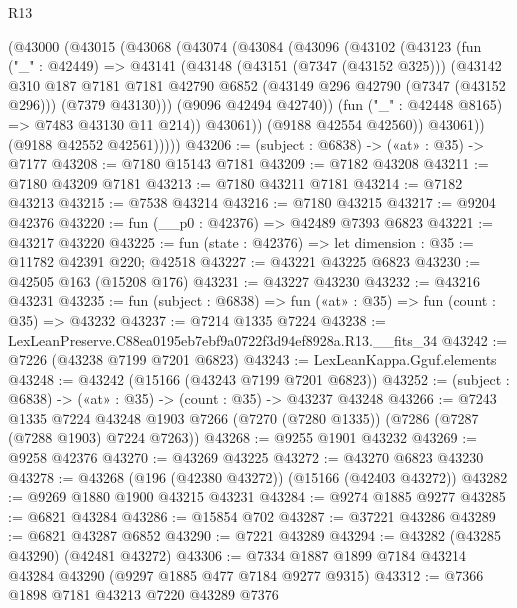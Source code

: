 \begin{lexlean}{R13}
\begin{coremodule}
        (@43000
          (@43015
            (@43068
              (@43074
                (@43084
                  (@43096
                    (@43102
                      (@43123
                        (fun ("_" : @42449) =>
                        @43141
                          (@43148
                            (@43151 (@7347 (@43152 @325)))
                            (@43142
                              @310
                              @187
                              @7181
                              @7181
                              @42790
                              @6852
                              (@43149 @296 @42790 (@7347 (@43152 @296)))
                              (@7379 @43130)))
                          (@9096 @42494 @42740))
                        (fun ("_" : @42448 @8165) => @7483 @43130 @11 @214))
                      @43061))
                  (@9188 @42554 @42560))
                @43061))
            (@9188 @42552 @42561)))))
@43206 := (subject : @6838) -> («at» : @35) -> @7177
@43208 := @7180 @15143 @7181
@43209 := @7182 @43208
@43211 := @7180 @43209 @7181
@43213 := @7180 @43211 @7181
@43214 := @7182 @43213
@43215 := @7538 @43214
@43216 := @7180 @43215
@43217 := @9204 @42376
@43220 := fun (__p0 : @42376) => @42489 @7393 @6823
@43221 := @43217 @43220
@43225 := fun (state : @42376) => let dimension : @35 := @11782 @42391 @220; @42518
@43227 := @43221 @43225 @6823
@43230 := @42505 @163 (@15208 @176)
@43231 := @43227 @43230
@43232 := @43216 @43231
@43235 := fun (subject : @6838) => fun («at» : @35) => fun (count : @35) => @43232
@43237 := @7214 @1335 @7224
@43238 := LexLeanPreserve.C88ea0195eb7ebf9a0722f3d94ef8928a.R13.__fits_34
@43242 := @7226 (@43238 @7199 @7201 @6823)
@43243 := LexLeanKappa.Gguf.elements
@43248 := @43242 (@15166 (@43243 @7199 @7201 @6823))
@43252 := (subject : @6838) -> («at» : @35) -> (count : @35) -> @43237 @43248
@43266 := @7243
    @1335
    @7224
    @43248
    @1903
    @7266
    (@7270 (@7280 @1335))
    (@7286 (@7287 (@7288 @1903) @7224 @7263))
@43268 := @9255 @1901 @43232
@43269 := @9258 @42376
@43270 := @43269 @43225
@43272 := @43270 @6823 @43230
@43278 := @43268 (@196 (@42380 @43272)) (@15166 (@42403 @43272))
@43282 := @9269 @1880 @1900 @43215 @43231
@43284 := @9274 @1885 @9277
@43285 := @6821 @43284
@43286 := @15854 @702
@43287 := @37221 @43286
@43289 := @6821 @43287 @6852
@43290 := @7221 @43289
@43294 := @43282 (@43285 @43290) (@42481 @43272)
@43306 := @7334 @1887 @1899 @7184 @43214 @43284 @43290 (@9297 @1885 @477 @7184 @9277 @9315)
@43312 := @7366 @1898 @7181 @43213 @7220 @43289 @7376

\end{coremodule}
\end{lexlean}
